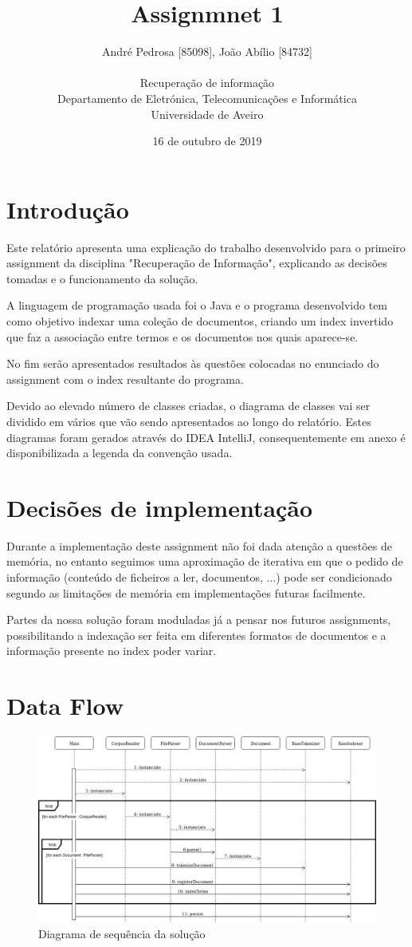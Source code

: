 \documentclass[12pt]{article}
\title{Assignmnet 1}
\author{
    André Pedrosa [85098], João Abílio [84732]\\
    \\
    Recuperação de informação\\
    \normalsize{Departamento de Eletrónica, Telecomunicações e Informática}\\
    \normalsize{Universidade de Aveiro}\\
}
\date{16 de outubro de 2019}
\begin{document}
\baselineskip18pt

\maketitle

\section{Introdução}
Este relatório apresenta uma explicação do trabalho desenvolvido
para o primeiro assignment da disciplina "Recuperação de Informação",
explicando as decisões tomadas e o funcionamento da solução.

A linguagem de programação usada foi o Java e o programa desenvolvido
tem como objetivo indexar uma coleção de documentos, criando um index
invertido que faz a associação entre termos e os documentos nos quais
aparece-se.

No fim serão apresentados resultados às questões colocadas no enunciado
do assignment com o index resultante do programa.

Devido ao elevado número de classes criadas, o diagrama de classes vai ser
dividido em vários que vão sendo apresentados ao longo do relatório. Estes
diagramas foram gerados através do IDEA IntelliJ, consequentemente em anexo
é disponibilizada a legenda da convenção usada.

\section{Decisões de implementação}
Durante a implementação deste assignment não foi dada atenção a questões de memória,
no entanto seguimos uma aproximação de iterativa em que o pedido de informação
(conteúdo de ficheiros a ler, documentos, ...) pode ser condicionado segundo as
limitações de memória em implementações futuras facilmente.

Partes da nossa solução foram moduladas já a pensar nos futuros assignments,
possibilitando a indexação ser feita em diferentes formatos de documentos e a informação
presente no index poder variar.

\section{Data Flow}
\begin{figure}[h]
  \center
  \includegraphics[width=17cm]{sequenceDiagram.png}
  \caption{Diagrama de sequência da solução}
\end{figure}
\end{document}
